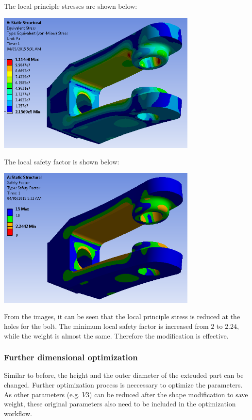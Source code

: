 \documentclass[a4paper,14pt]{extarticle}
\begin{document}
The local principle stresses are shown below:

\begin{center}\includegraphics[width=0.75\textwidth]{NX/STRESS_F.PNG}\end{center}

The local safety factor is shown below:

\begin{center}\includegraphics[width=0.75\textwidth]{NX/SF_F.PNG}\end{center}

From the images, it can be seen that the local principle stress is reduced at the holes for the bolt. The minimum local safety factor is increased from $2$ to $2.24$, while the weight is almost the same. Therefore the modification is effective.
\subsubsection{Further dimensional optimization}
Similar to before, the height and the outer diameter of the extruded part can be changed. Further optimization process is neccessary to optimize the parameters. As other parameters (e.g. $V3$) can be reduced after the shape modification to save weight, these original parameters also need to be included in the optimization workflow.
\end{document}
